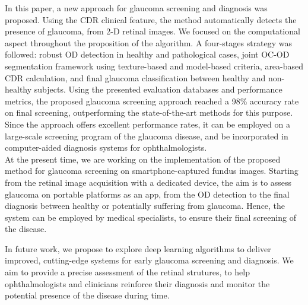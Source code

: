 In this paper, a new approach for glaucoma screening and diagnosis was proposed. Using the CDR clinical feature, the method automatically detects the presence of glaucoma, from 2-D retinal images. We focused on the computational aspect throughout the proposition of the algorithm. A four-stages strategy was followed: robust OD detection in healthy and pathological cases, joint OC-OD segmentation framework using texture-based and model-based criteria, area-based CDR calculation, and final glaucoma classification between healthy and non-healthy subjects.
Using the presented evaluation databases and performance metrics, the proposed glaucoma screening approach reached a 98\% accuracy rate on final screening, outperforming the state-of-the-art methods for this purpose. 
Since the approach offers excellent performance rates, it can be employed on a large-scale screening program of the glaucoma disease, and be incorporated in computer-aided diagnosis systems for ophthalmologists. \\

At the present time, we are working on the implementation of the proposed method for glaucoma screening on smartphone-captured fundus images. Starting from the retinal image acquisition with a dedicated device, the aim is to assess glaucoma on portable platforms as an app, from the OD detection to the final diagnosis between healthy or potentially suffering from glaucoma. Hence, the system can be employed by medical specialists, to ensure their final screening of the disease.

In future work, we propose to explore deep learning algorithms to deliver improved, cutting-edge systems for early glaucoma screening and diagnosis. We aim to provide a precise assessment of the retinal strutures, to help ophthalmologists and clinicians reinforce their diagnosis and monitor the potential presence of the disease during time.



